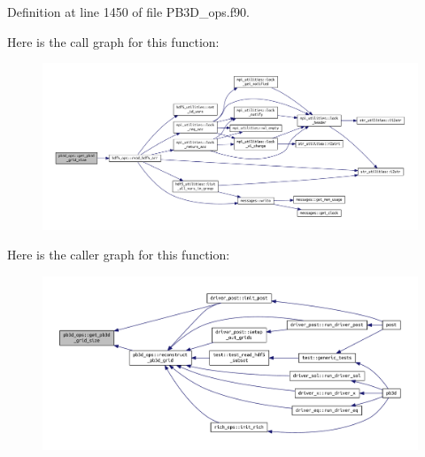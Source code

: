 Definition at line 1450 of file P\+B3\+D\+\_\+ops.\+f90.

Here is the call graph for this function\+:\nopagebreak
\begin{figure}[H]
\begin{center}
\leavevmode
\includegraphics[width=350pt]{namespacepb3d__ops_a528ae2857b7272d29d96f66ee60980a7_cgraph}
\end{center}
\end{figure}
Here is the caller graph for this function\+:\nopagebreak
\begin{figure}[H]
\begin{center}
\leavevmode
\includegraphics[width=350pt]{namespacepb3d__ops_a528ae2857b7272d29d96f66ee60980a7_icgraph}
\end{center}
\end{figure}
\mbox{\label{namespacepb3d__ops_a3142ca9965fa01b2777db762ed1a6eba}} 
